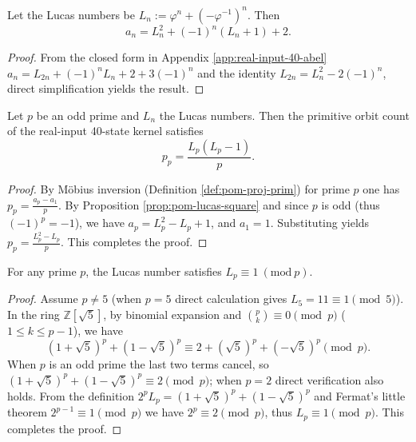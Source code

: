 

\begin{proposition}\label{prop:pom-lucas-square}
Let the Lucas numbers be
\(
L_n:=\varphi^n+(-\varphi^{-1})^n
\).
Then
\[
a_n=L_n^2+(-1)^n(L_n+1)+2.
\]
\end{proposition}
\begin{proof}
From the closed form in Appendix \ref{app:real-input-40-abel}
\(
a_n=L_{2n}+(-1)^nL_n+2+3(-1)^n
\)
and the identity $L_{2n}=L_n^2-2(-1)^n$, direct simplification yields the result.
\end{proof}

\begin{proposition}\label{prop:pom-primitive-prime-lucas}
Let \(p\) be an odd prime and \(L_n\) the Lucas numbers. Then the primitive orbit count of the real-input 40-state kernel satisfies
$$
p_p=\frac{L_p(L_p-1)}{p}.
$$
\end{proposition}
\begin{proof}
By Möbius inversion (Definition \ref{def:pom-proj-prim}) for prime \(p\) one has
\(
p_p=\frac{a_p-a_1}{p}
\).
By Proposition \ref{prop:pom-lucas-square} and since \(p\) is odd (thus \((-1)^p=-1\)), we have
\(
a_p=L_p^2-L_p+1
\), and \(a_1=1\).
Substituting yields \(p_p=\frac{L_p^2-L_p}{p}\). This completes the proof.
\end{proof}

\begin{lemma}[Lucas Prime Congruence: \texorpdfstring{$L_p\equiv 1\pmod p$}{Lp=1 mod p}]\label{lem:pom-lucas-modp}
For any prime \(p\), the Lucas number satisfies \(L_p\equiv 1\ (\mathrm{mod}\ p)\).
\end{lemma}
\begin{proof}
Assume \(p\neq 5\) (when \(p=5\) direct calculation gives \(L_5=11\equiv 1\pmod 5\)). In the ring \(\mathbb{Z}[\sqrt5]\),
by binomial expansion and \(\binom{p}{k}\equiv 0\pmod p\) (\(1\le k\le p-1\)), we have
$$
(1+\sqrt5)^p+(1-\sqrt5)^p\equiv 2+(\sqrt5)^p+(-\sqrt5)^p\pmod p.
$$
When \(p\) is an odd prime the last two terms cancel, so
\(
(1+\sqrt5)^p+(1-\sqrt5)^p\equiv 2\pmod p
\);
when \(p=2\) direct verification also holds. From the definition \(2^p L_p=(1+\sqrt5)^p+(1-\sqrt5)^p\) and Fermat's little theorem \(2^{p-1}\equiv 1\pmod p\) we have
\(
2^p\equiv 2\pmod p
\), thus \(L_p\equiv 1\pmod p\). This completes the proof.
\end{proof}


